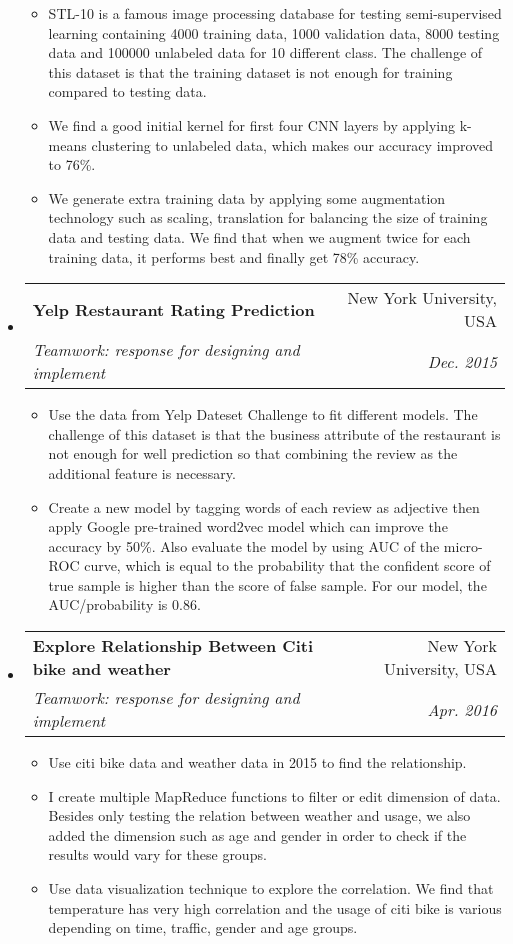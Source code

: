 \documentclass[a4paper,11pt]{article}
\makeatletter
\newcommand{\resitem}[1]{\item #1 \vspace{-2pt}}
\renewcommand{\normalsize}{\fontsize{12pt}{\baselineskip}\selectfont}
\newcommand{\ressubheading}[4]{
	\begin{tabular*}{6.5in}{l@{\extracolsep{\fill}}r}
		\textbf{#1} & #2 \\
		\textit{#3} & \textit{#4} \\
	\end{tabular*}\vspace{-6pt}}
\makeatother
\begin{document}
\begin{itemize}
			\begin{itemize}
				\resitem{STL-10 is a famous image processing database for testing semi-supervised learning containing 4000 training data, 1000 validation data, 8000 testing data and 100000 unlabeled data for 10 different class. The challenge of this dataset is that the training dataset is not enough for training compared to testing data.}
				\resitem{We find a good initial kernel for first four CNN layers by applying k-means clustering to unlabeled data, which makes our accuracy improved to 76\%.} 
				\resitem{We generate extra training data by applying some augmentation technology such as scaling, translation for balancing the size of training data and testing data. We find that when we augment twice for each training data, it performs best and finally get 78\% accuracy.}
			\end{itemize}
			
				\item \ressubheading{{\normalsize Yelp Restaurant Rating Prediction}}{New York University, USA}{\normalsize Teamwork: response for designing and implement}{Dec. 2015}
				
					\begin{itemize}
						\resitem{Use the data from Yelp Dateset Challenge to fit different models. The challenge of this dataset is that the business attribute of the restaurant is not enough for well prediction so that combining the review as the additional feature is necessary.}
						\resitem{Create a new model by tagging words of each review as adjective then apply Google pre-trained word2vec model which can improve the accuracy by 50\%. Also evaluate the model by using AUC of the micro-ROC curve, which is equal to the probability that the confident score of true sample is higher than the score of false sample. For our model, the AUC/probability is 0.86.}
					\end{itemize}
			
				\item \ressubheading{\normalsize Explore Relationship Between Citi bike and weather}{New York University, USA}{\normalsize Teamwork: response for designing and implement}{Apr. 2016}
				\begin{itemize}
					\resitem{Use citi bike data and weather data in 2015 to find the relationship.}
					\resitem{I create multiple MapReduce functions to filter or edit dimension of data. Besides only testing the relation between weather and usage, we also added the dimension such as age and gender in order to check if the results would vary for these groups.}
					\resitem{Use data visualization technique to explore the correlation. We find that temperature has very high correlation and the usage of citi bike is various depending on time, traffic, gender and age groups.}
				\end{itemize}
			

\end{itemize}
\end{document}
